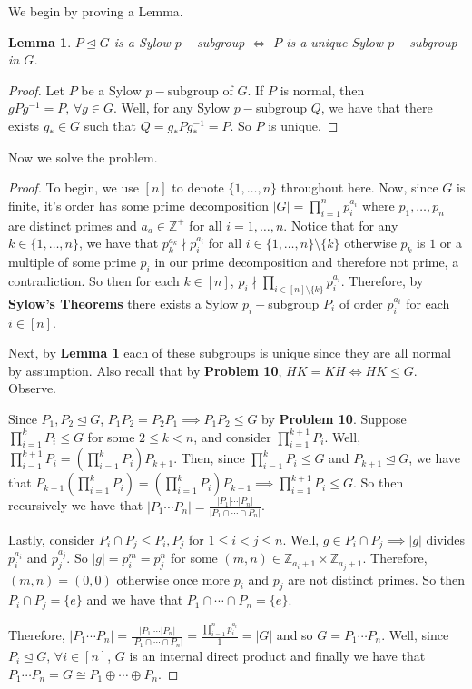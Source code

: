 \documentclass[addpoints,10pt]{exam}
\theoremstyle{plain}
\theoremstyle{definition}
\theoremstyle{plain}
\theoremstyle{plain}
\newtheorem{lem}[thm]{Lemma}
\theoremstyle{definition}
\newcommand{\belowtitle}{\leavevmode\newline}
\newcommand{\ZZ}{\ensuremath{\mathbb{Z}}}
\begin{document}
We begin by proving a Lemma.
\setcounter{thm}{0}
\begin{lem}
$P\trianglelefteq G$ is a Sylow $p-$subgroup $\iff$ $P$ is a unique Sylow $p-$subgroup in $G$.
\end{lem}

\begin{proof}
  Let $P$ be a Sylow $p-$subgroup of $G$. If $P$ is normal, then $gPg^{-1}=P,\,\forall g\in G$. Well, for any Sylow $p-$subgroup $Q$, we have that there exists $g_{*}\in G$ such that $Q=g_{*}Pg_{*}^{-1}=P$. So $P$ is unique.
\end{proof}
Now we solve the problem.
\begin{proof}
  To begin, we use $[n]$ to denote $\{1,\hdots, n\}$ throughout here. \belowtitle Now, since $G$ is finite, it's order has some prime decomposition $|G|=\prod_{i=1}^{n} p_{i}^{a_{i}}$ where $p_{1},\hdots, p_{n}$ are distinct primes and $a_{a}\in \ZZ^{+}$ for all $i=1,\hdots, n$. Notice that for any $k\in \{1,\hdots, n\}$, we have that $p_{k}^{a_{k}}\nmid p_{i}^{a_{i}}$ for all $i\in \{1,\hdots, n\}\setminus \{k\}$ otherwise $p_{k}$ is $1$ or a multiple of some prime $p_{i}$ in our prime decomposition and therefore not prime, a contradiction. So then for each $k\in [n]$, $p_{i}\nmid \prod_{i\in [n]\setminus \{k\}}p_{i}^{a_{i}}$. Therefore, by \textbf{Sylow's Theorems} there exists a Sylow $p_{i}-$subgroup $P_{i}$ of order $p_{i}^{a_{i}}$ for each $i\in [n]$.

  Next, by \textbf{Lemma 1} each of these subgroups is unique since they are all normal by assumption. Also recall that by \textbf{Problem 10}, $HK=KH\iff HK\leq G.$ Observe.

  Since $P_{1},P_{2}\trianglelefteq G$,  $P_{1}P_{2}=P_{2}P_{1}\implies P_{1}P_{2}\leq G$ by \textbf{Problem 10}. Suppose $\prod_{i=1}^{k}P_{i}\leq G$ for some $2\leq k<n$, and consider $\prod_{i=1}^{k+1}P_{i}$. Well, $\prod_{i=1}^{k+1}P_{i}=(\prod_{i=1}^{k}P_{i})P_{k+1}$. Then, since $\prod_{i=1}^{k}P_{i}\leq G$ and $P_{k+1}\trianglelefteq G$, we have that $P_{k+1}(\prod_{i=1}^{k}P_{i})=(\prod_{i=1}^{k}P_{i})P_{k+1}\implies \prod_{i=1}^{k+1}P_{i}\leq G$. So then recursively we have that $|P_{1}\cdots P_{n}|=\frac{|P_{1}|\cdots |P_{n}|}{|P_{1}\cap \cdots \cap P_{n}|}$. 

  Lastly, consider $P_{i}\cap P_{j}\leq P_{i},P_{j}$ for $1\leq i<j\leq n$. Well, $g\in P_{i}\cap P_{j}\implies |g|$ divides $p_{i}^{a_{i}}$ and $p_{j}^{a_{j}}$. So $|g|=p_{i}^{m}=p_{j}^{n}$ for some $(m,n)\in \ZZ_{a_{i}+1}\times \ZZ_{a_{j}+1}$. Therefore, $(m,n)=(0,0)$ otherwise once more $p_{i}$ and $p_{j}$ are not distinct primes. So then $P_{i}\cap P_{j}=\{e\}$ and we have that $P_{1}\cap \cdots \cap P_{n}=\{e\}$.

  Therefore, $|P_{1}\cdots P_{n}|=\frac{|P_{1}|\cdots |P_{n}|}{|P_{1}\cap \cdots \cap P_{n}|}=\frac{\prod_{i=1}^{n} p_{i}^{a_{i}}}{1}=|G|$ and so $G=P_{1}\cdots P_{n}$. Well, since $P_{i}\trianglelefteq G,\,\forall i\in [n]$, $G$ is an internal direct product and finally we have that $P_{1}\cdots P_{n}=G\cong P_{1}\oplus \cdots \oplus P_{n}$.

\end{proof}
\end{document}
